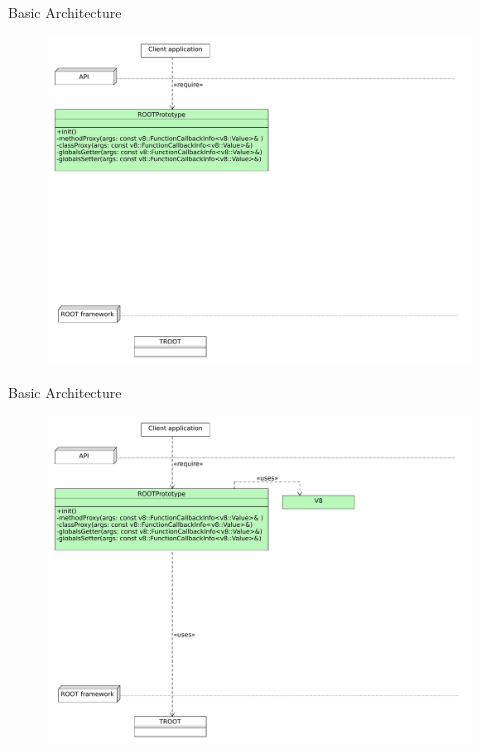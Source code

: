 \begin{frame}{Basic Architecture}
  \begin{figure}[htb]
    \centering
      \includegraphics[width=\textwidth, height=.85\textheight, keepaspectratio]{./resources/architecture/architecture_h1.pdf}
  \end{figure}
\end{frame}

\begin{frame}{Basic Architecture}
  \begin{figure}[htb]
    \centering
      \includegraphics[width=\textwidth, height=.85\textheight, keepaspectratio]{./resources/architecture/architecture_h2.pdf}
  \end{figure}
\end{frame}

